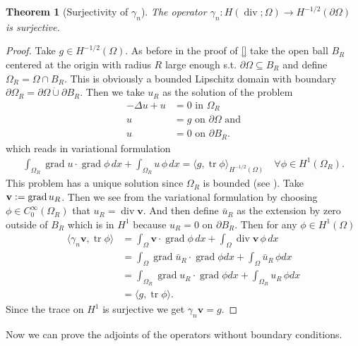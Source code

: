 \documentclass[12pt,a4paper]{article}
\numberwithin{equation}{subsection}
\numberwithin{lemma}{subsection}
\newtheorem{theorem}[lemma]{Theorem}
\theoremstyle{definition}
\DeclareMathOperator{\diver}{div}
\DeclareMathOperator{\grad}{grad}
\DeclareMathOperator{\tr}{tr}
\begin{document}
\begin{theorem}[Surjectivity of $\gamma_n$]
    The operator $\gamma_n: H(\diver; \Omega) \rightarrow H^{-1/2}(\partial\Omega)$ 
    is surjective.
\end{theorem}
\begin{proof}
    Take $g \in H^{-1/2}(\Omega)$. As before in the proof of \ref{} take 
    the open ball $B_R$ centered at the origin with radius $R$ large enough 
    s.t. $\partial \Omega\subseteq B_R$ and define $\Omega_R = \Omega \cap B_R$.
    This is obviously a bounded Lipschitz domain with boundary 
    $\partial \Omega_R = \partial \Omega \dot{\cup} \partial B_R$.
    Then we take $u_R$ as the solution 
    of the problem 
    \begin{align*}
        -\Delta u + u &= 0 \text{ in $\Omega_R$} \\
        u &= g \text{ on $\partial \Omega$ and} 
        \\ u &= 0 \text{ on $\partial B_R$.} 
    \end{align*}
    which reads in variational formulation
    \begin{align*}
        \int_{\Omega_R} \grad u \cdot \grad \phi \, dx + \int_{\Omega_R} u \, \phi \,dx 
        = \langle g, \tr \phi \rangle_{H^{-1/2}(\Omega)} \quad \forall \phi \in H^1(\Omega_R).
    \end{align*}
    This problem has a unique solution since $\Omega_R$ is bounded (see \cite[Thm. 3.12]{monk}).
    Take $\mathbf{v} \vcentcolon= \grad u_R$. Then we see from the variational 
    formulation by choosing $\phi \in C_0^\infty(\Omega_R)$ that $u_R = \diver \mathbf{v}$.
    And then define $\bar{u}_R$ as the extension by zero outside of $B_R$ which is in $H^1$ 
    because $u_R = 0$ on $\partial B_R$. Then for any $\phi \in H^1(\Omega)$
    \begin{align*}
        \langle \gamma_n \mathbf{v}, \tr \phi \rangle 
        &= \int_\Omega \mathbf{v} \cdot \grad \phi \, dx 
            + \int_\Omega \diver \mathbf{v} \, \phi \, dx
        \\ &= \int_\Omega \grad \bar{u}_R \cdot \grad \phi dx
            + \int_\Omega \bar{u}_R \, \phi dx 
        \\ &= \int_{\Omega_R} \grad u_R \cdot \grad \phi dx
            + \int_{\Omega_R} u_R \, \phi dx 
        \\ &= \langle g, \tr \phi \rangle.
    \end{align*}
    Since the trace on $H^1$ is surjective we get $\gamma_n \mathbf{v} = g$.
\end{proof}
Now we can prove the adjoints of the operators without boundary conditions.
\end{document}
